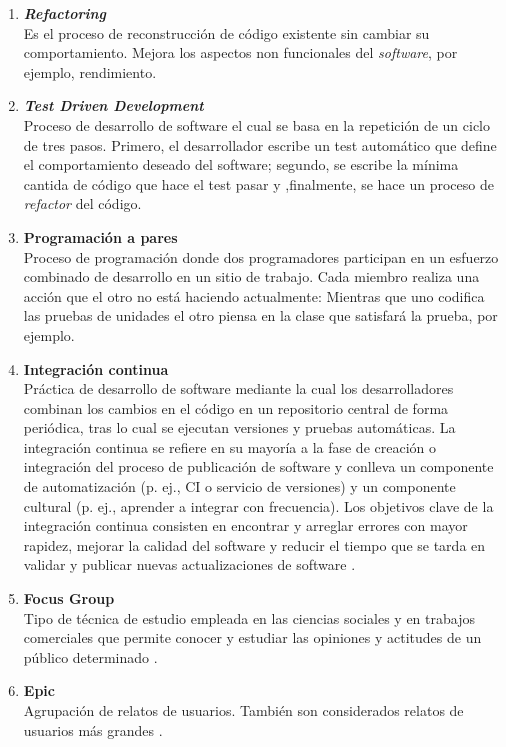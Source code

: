 \begin{enumerate}
  \item \label{refactoring} \textbf{\textit{Refactoring}}\mbox{}\\ Es el proceso de reconstrucción de código existente sin cambiar su comportamiento. Mejora los aspectos non funcionales del \textit{software}, por ejemplo, rendimiento.
  \item \label{tdd} \textbf{\textit{Test Driven Development}}\mbox{}\\ Proceso de desarrollo de software el cual se basa en la repetición de un ciclo de tres pasos. Primero, el desarrollador escribe un test automático que define el comportamiento deseado del software; segundo, se escribe la mínima cantida de código que hace el test pasar y ,finalmente, se hace un proceso de \textit{refactor} del código.
  \item \label{pair_programming} \textbf{Programación a pares}\mbox{}\\ Proceso de programación donde dos programadores participan en un esfuerzo combinado de desarrollo en un sitio de trabajo. Cada miembro realiza una acción que el otro no está haciendo actualmente: Mientras que uno codifica las pruebas de unidades el otro piensa en la clase que satisfará la prueba, por ejemplo.
  \item \label{continuous_integration} \textbf{Integración continua}\mbox{}\\ Práctica de desarrollo de software mediante la cual los desarrolladores combinan los cambios en el código en un repositorio central de forma periódica, tras lo cual se ejecutan versiones y pruebas automáticas. La integración continua se refiere en su mayoría a la fase de creación o integración del proceso de publicación de software y conlleva un componente de automatización (p. ej., CI o servicio de versiones) y un componente cultural (p. ej., aprender a integrar con frecuencia). Los objetivos clave de la integración continua consisten en encontrar y arreglar errores con mayor rapidez, mejorar la calidad del software y reducir el tiempo que se tarda en validar y publicar nuevas actualizaciones de software \cite{aws}.
  \item \label{focus_group} \textbf{Focus Group}\mbox{}\\ Tipo de técnica de estudio empleada en las ciencias sociales y en trabajos comerciales que permite conocer y estudiar las opiniones y actitudes de un público determinado \cite{abc}.
  \item \label{epic} \textbf{Epic}\mbox{}\\ Agrupación de relatos de usuarios. También son considerados relatos de usuarios más grandes \cite{epic}.

\end{enumerate}

